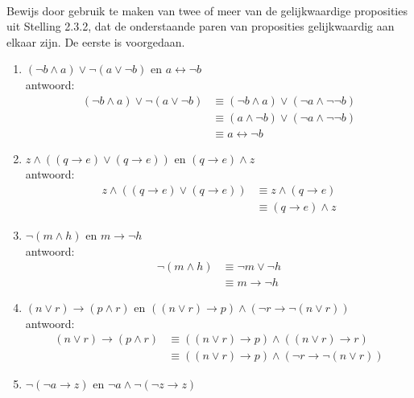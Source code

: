 \begin{answer}\mbox{}\\ %
Bewijs door gebruik te maken van twee of meer van de gelijkwaardige proposities uit Stelling 2.3.2, dat de onderstaande paren van proposities gelijkwaardig aan elkaar zijn. De eerste is voorgedaan.
\begin{enumerate}[label=\textit{\alph*.}]
\item $(\neg b\land a)\lor \neg (a\lor \neg b)$ en $a\leftrightarrow \neg b$\\
antwoord:
\begin{align}
(\neg b\wedge a)\vee \neg (a\vee \neg b) &\equiv (\neg b\wedge a)\vee (\neg a \wedge \neg \neg b)  \tag{St-2.3.2: 9} \\
&\equiv (a\wedge \neg b)\vee (\neg a \wedge \neg \neg b)  \tag{St-2.3.2: 3} \\
&\equiv a\leftrightarrow \neg b\tag{St-2.3.2: 4}
\end{align}
\item $z\land ((q\rightarrow e) \lor (q\rightarrow e))$ en $(q \rightarrow e) \land z$\\
antwoord:
\begin{align}
z\wedge ((q\rightarrow e)\vee (q\rightarrow e)) &\equiv z\wedge (q\rightarrow e)  \tag{St-2.3.2: 1} \\
&\equiv (q\rightarrow e) \wedge z\tag{St-2.3.2: 3}
\end{align}
\item $\neg (m\land h)$ en $m \rightarrow \neg h$\\
antwoord:
\begin{align}
\neg (m \wedge h)&\equiv \neg m\vee \neg h \tag{St-2.3.2:10} \\
&\equiv m \rightarrow \neg h\tag{St-2.3.2: 7}
\end{align}
\item $(n \lor r)\rightarrow (p \land r)$ en $((n \lor r)\rightarrow p) \land (\neg r \rightarrow \neg (n \lor r))$\\
antwoord:
\begin{align}
(n \vee r)\rightarrow (p\wedge r) &\equiv ((n \vee r)\rightarrow p) \wedge ((n \vee r)\rightarrow r) \tag{St-2.3.2:14} \\
&\equiv ((n \vee r)\rightarrow p) \wedge (\neg r \rightarrow \neg (n \vee r))\tag{St-2.3.2: 7}
\end{align}
\item $\neg (\neg a \rightarrow z)$ en $\neg a \land \neg (\neg z\rightarrow z)$\\

\end{enumerate}
\end{answer}
